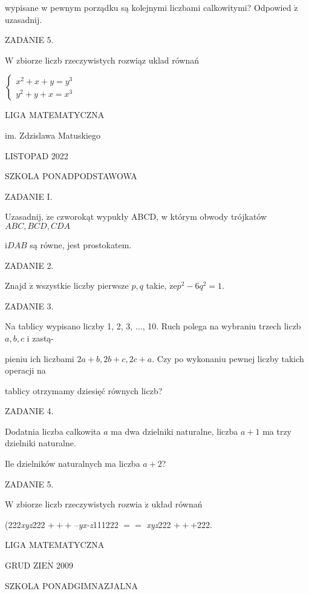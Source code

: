 \documentclass[a4paper,12pt]{article}
\begin{document}
wypisane w pewnym porządku są kolejnymi liczbami calkowitymi? Odpowied $\acute{\mathrm{z}}$ uzasadnij.

ZADANIE 5.

$\mathrm{W}$ zbiorze liczb rzeczywistych rozwiąz uklad równań

$\left\{\begin{array}{l}
x^{2}+x+y=y^{3}\\
y^{2}+y+x=x^{3}
\end{array}\right.$






LIGA MATEMATYCZNA

im. Zdzislawa Matuskiego

LISTOPAD 2022

SZKOLA PONADPODSTAWOWA

ZADANIE I.

Uzasadnij, $\dot{\mathrm{z}}\mathrm{e}$ czworokąt wypukły ABCD, w którym obwody trójkatów $ABC, BCD, CDA$

$\mathrm{i}DAB$ są równe, jest prostokatem.

ZADANIE 2.

Znajd $\acute{\mathrm{z}}$ wszystkie liczby pierwsze $p, q$ takie, $\dot{\mathrm{z}}\mathrm{e}p^{2}-6q^{2}=1.$

ZADANIE 3.

Na tablicy wypisano liczby 1, 2, 3, $\ldots$, 10. Ruch polega na wybraniu trzech liczb $a, b, c$ i zastą-

pieniu ich liczbami $2a+b, 2b+c, 2c+a$. Czy po wykonaniu pewnej liczby takich operacji na

tablicy otrzymamy dziesięć równych liczb?

ZADANIE 4.

Dodatnia liczba calkowita $a$ ma dwa dzielniki naturalne, liczba $a+1$ ma trzy dzielniki naturalne.

Ile dzielników naturalnych ma liczba $a+2$?

ZADANIE 5.

$\mathrm{W}$ zbiorze liczb rzeczywistych rozwia $\dot{\mathrm{z}}$ układ równań

(222{\it xyz}222 $+++$ --{\it yx-z}111222 $==$ {\it xyz}222 $+++$222.






LIGA MATEMATYCZNA

GRUD Z$\mathrm{I}\mathrm{E}\acute{\mathrm{N}}$ 2009

SZKOLA PONADGIMNAZJALNA
\end{document}
